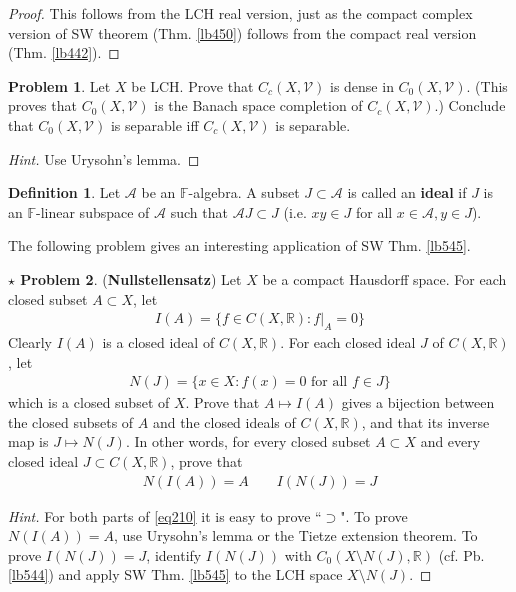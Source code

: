 \documentclass[12pt,b5paper,notitlepage]{article}
\theoremstyle{definition}
\newtheorem{df}{Definition}[section]
\newtheorem{prob}{\color{red}Problem}[section]
\newtheorem{sprob}[prob]{\color{red}$\star$ Problem}
\theoremstyle{plain}
\newcommand{\mc}{\mathcal}
\newcommand{\scr}{\mathscr}
\newcommand{\Rbb}{\mathbb R}
\newcommand{\Fbb}{\mathbb F}
\numberwithin{equation}{section}
\begin{document}
\begin{proof}
This follows from the LCH real version, just as the compact complex version of SW theorem (Thm. \ref{lb450}) follows from the compact real version (Thm. \ref{lb442}).
\end{proof}





\begin{prob}\label{lb485}
Let $X$ be LCH. Prove that $C_c(X,\mc V)$ is dense in $C_0(X,\mc V)$. (This proves that $C_0(X,\mc V)$ is the Banach space completion of $C_c(X,\mc V)$.) Conclude that $C_0(X,\mc V)$ is separable iff $C_c(X,\mc V)$ is separable.
\end{prob}

\begin{proof}[Hint]
Use Urysohn's lemma.
\end{proof}


\begin{df}
Let $\scr A$ be an $\Fbb$-algebra. A subset $J\subset \scr A$ is called an \textbf{ideal} if $J$ is an $\Fbb$-linear subspace of $\scr A$ such that $\scr A J\subset J$ (i.e. $xy\in J$ for all $x\in\scr A,y\in J$). 
\end{df}

The following problem gives an interesting application of SW Thm. \ref{lb545}.

\begin{sprob}
(\textbf{Nullstellensatz}) \index{00@Nullstellensatz for $C(X,\Rbb)$}  Let $X$ be a compact Hausdorff space. For each closed subset $A\subset X$, let
\begin{align*}
I(A)=\{f\in C(X,\Rbb):f|_A=0\}
\end{align*} 
Clearly $I(A)$ is a closed ideal of $C(X,\Rbb)$. For each closed ideal $J$ of $C(X,\Rbb)$, let
\begin{align*}
N(J)=\{x\in X:f(x)=0\text{ for all }f\in J\}
\end{align*}
which is a closed subset of $X$. Prove that $A\mapsto I(A)$ gives a bijection between the  closed subsets of $A$ and the closed ideals of $C(X,\Rbb)$, and that its inverse map is $J\mapsto N(J)$. In other words, for every closed subset $A\subset X$ and every closed ideal $J\subset C(X,\Rbb)$, prove that
\begin{gather}
N(I(A))=A\qquad I(N(J))=J \label{eq210}
\end{gather}
\end{sprob}
\begin{proof}[Hint]
For both parts of \eqref{eq210} it is easy to prove ``$\supset$". To prove $N(I(A))= A$, use Urysohn's lemma or the Tietze extension theorem. To prove $I(N(J))=J$, identify $I(N(J))$ with $C_0(X\setminus N(J),\Rbb)$ (cf. Pb. \ref{lb544}) and apply SW Thm. \ref{lb545} to the LCH space $X\setminus N(J)$.
\end{proof}
\end{document}

